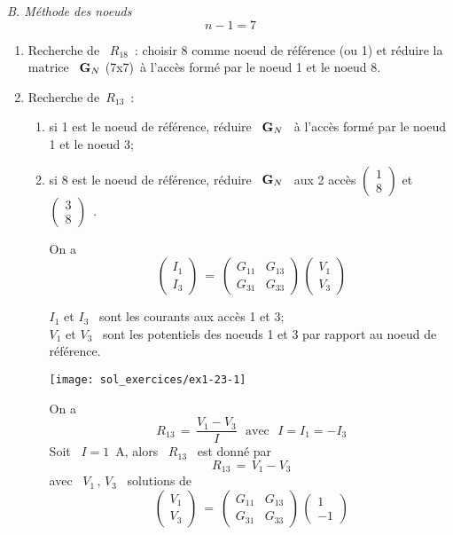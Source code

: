 {\em B. Méthode des noeuds}
\[n-1=7\]
\begin{enumerate}
	\item Recherche de \ $R_{18}$~: choisir 8 comme noeud de référence (ou
	1) et réduire la matrice \ ${\bf G}_N$ (7x7)\ à l'accès formé par le
	noeud 1 et le noeud 8.
	\item Recherche de\  $R_{13}$~: 
	\begin{enumerate}
		\item si 1 est le noeud de référence, réduire \ ${\bf G}_N$ \ à
		l'accès formé par le noeud 1 et le noeud 3;
		\item si 8 est le noeud de référence, réduire \ ${\bf G}_N$ \ aux 2
		accès $ \left( \begin{array}{c} 1\\ 8 \end{array} \right)$ et $ \left(
		\begin{array}{c} 3\\ 8 \end{array} \right)$~.
		
		On a
		\[ \left( \begin{array}{c} I_1 \\ I_3 \end{array} \right)
		\: = \: 
		\left( \begin{array}{cc} 
		G_{11} & G_{13}\\ G_{31} & G_{33}
		\end{array} \right) \, 
		\left( \begin{array}{c} V_1\\ V_3 \end{array} \right) \]
		
		$I_1$ et $I_3$ \ sont les courants aux accès 1 et 3;\\
		$V_1$ et $V_3$ \ sont les potentiels des noeuds 1 et 3 par rapport au noeud de référence.
		
		\begin{center}
			\texttt{[image: sol\_exercices/ex1-23-1]}
		\end{center}
		
		
		On a
		\[ R_{13} \, = \, \dfrac{V_1-V_3}{I} ~~~\mbox{avec}~~~ I=I_1=-I_3 \]
		Soit \ $I=1$~A, alors \ $R_{13}$ \ est donné par
		\[ R_{13} \, = \, V_1-V_3\]
		avec \ $V_1\, , \, V_3$ \ solutions de
		\[  \left( \begin{array}{c} V_1 \\ V_3 \end{array} \right) 
		\: = \: 
		\left( \begin{array}{cc} 
		G_{11} & G_{13}\\ G_{31} & G_{33}
		\end{array} \right) \, 
		\left( \begin{array}{c} 1\\ -1 \end{array} \right) \]
	\end{enumerate}
\end{enumerate}

